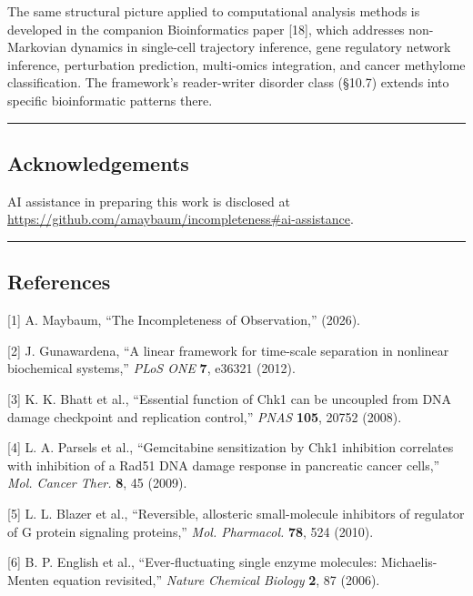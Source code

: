 \documentclass[
]{article}
\begin{document}
The same structural picture applied to computational analysis methods is
developed in the companion Bioinformatics paper {[}18{]}, which
addresses non-Markovian dynamics in single-cell trajectory inference,
gene regulatory network inference, perturbation prediction, multi-omics
integration, and cancer methylome classification. The framework's
reader-writer disorder class (§10.7) extends into specific bioinformatic
patterns there.

\begin{center}\rule{0.5\linewidth}{0.5pt}\end{center}

\hypertarget{acknowledgements}{%
\subsection{Acknowledgements}\label{acknowledgements}}

AI assistance in preparing this work is disclosed at\\
\url{https://github.com/amaybaum/incompleteness\#ai-assistance}.

\begin{center}\rule{0.5\linewidth}{0.5pt}\end{center}

\hypertarget{references}{%
\subsection{References}\label{references}}

{[}1{]} A. Maybaum, ``The Incompleteness of Observation,'' (2026).

{[}2{]} J. Gunawardena, ``A linear framework for time-scale separation
in nonlinear biochemical systems,'' \emph{PLoS ONE} \textbf{7}, e36321
(2012).

{[}3{]} K. K. Bhatt et al., ``Essential function of Chk1 can be
uncoupled from DNA damage checkpoint and replication control,''
\emph{PNAS} \textbf{105}, 20752 (2008).

{[}4{]} L. A. Parsels et al., ``Gemcitabine sensitization by Chk1
inhibition correlates with inhibition of a Rad51 DNA damage response in
pancreatic cancer cells,'' \emph{Mol. Cancer Ther.} \textbf{8}, 45
(2009).

{[}5{]} L. L. Blazer et al., ``Reversible, allosteric small-molecule
inhibitors of regulator of G protein signaling proteins,'' \emph{Mol.
Pharmacol.} \textbf{78}, 524 (2010).

{[}6{]} B. P. English et al., ``Ever-fluctuating single enzyme
molecules: Michaelis-Menten equation revisited,'' \emph{Nature Chemical
Biology} \textbf{2}, 87 (2006).
\end{document}
